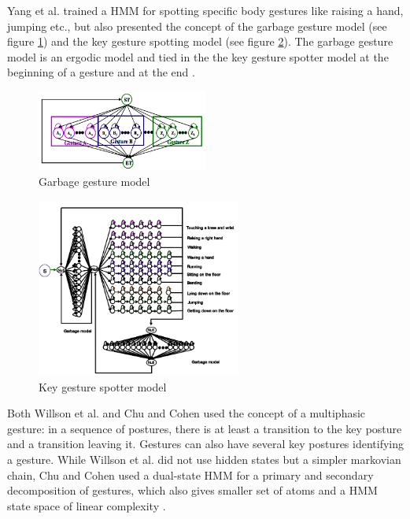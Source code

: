 Yang et al. trained a HMM for spotting specific body gestures like raising a hand, jumping etc., but also presented the concept of the garbage gesture model (see figure \ref{fig:garbage}) and the key gesture spotting model (see figure \ref{fig:gesturespotter}). The garbage gesture model is an ergodic model and tied in the the key gesture spotter model at the beginning of a gesture and at the end \cite{Yang}.
\begin{figure}[h!]
\center
\includegraphics[width=0.5\textwidth]{images/seminar/garbage.png}
\caption{Garbage gesture model \cite{Yang}}
\label{fig:garbage}
\end{figure}
\begin{figure}[h!]
\center
\includegraphics[width=0.6\textwidth]{images/seminar/gesturespotter.png}
\caption{Key gesture spotter model \cite{Yang}}
\label{fig:gesturespotter}
\end{figure}

Both Willson et al. and Chu and Cohen used the concept of a multiphasic gesture: in a sequence of postures, there is at least a transition to the key posture and a transition leaving it. Gestures can also have several key postures identifying a gesture. While Willson et al. did not use hidden states but a simpler markovian chain, Chu and Cohen used a dual-state HMM for a primary and secondary decomposition of gestures, which also gives smaller set of atoms and a HMM state space of linear complexity \cite{Chu,Wilson}.

